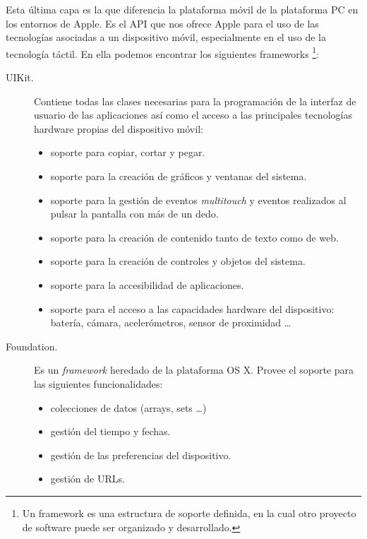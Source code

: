  Esta última capa es la que diferencia la plataforma móvil de la plataforma PC en los entornos de Apple. Es el API que nos ofrece %
  Apple para el uso de las tecnologías asociadas a un dispositivo móvil, especialmente en el uso de la tecnología táctil. En ella podemos encontrar los siguientes frameworks%
  \footnote{Un framework es una estructura de soporte definida, en la cual otro proyecto de software puede ser organizado y desarrollado.}: 


 \begin{description}
 	\item [UIKit.] Contiene todas las clases necesarias para la programación de la interfaz de usuario de las aplicaciones así como el acceso a las principales tecnologías hardware %
	 propias del dispositivo  móvil:
		 \begin{itemize}
 			\item soporte para copiar, cortar y pegar.
 			\item soporte para la creación de gráficos y ventanas del sistema.
 			\item soporte para la gestión de eventos \emph{multitouch} y eventos realizados al pulsar la pantalla con más de un dedo.
			 \item soporte para la creación de contenido tanto de texto como de web.
 			\item soporte para la creación de controles y objetos del sistema.
 			\item soporte para la accesibilidad de aplicaciones.
 			\item soporte para el acceso a las capacidades hardware del dispositivo: batería, cámara, acelerómetros, sensor de proximidad \ldots 
 		\end{itemize}
 	 \item [Foundation.] Es un \emph{framework} heredado de la plataforma OS X. Provee el soporte para las siguientes funcionalidades: %
 		\begin{itemize}
			\item colecciones de datos (arrays, sets \ldots)
			\item gestión del tiempo y fechas.
			\item gestión de las preferencias del dispositivo.
			\item gestión de URLs.

\end{itemize}
\end{description}

